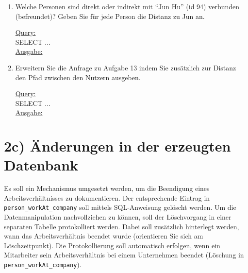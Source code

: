 \begin{enumerate}
    \item Welche Personen sind direkt oder indirekt mit \enquote{Jun Hu} (id 94) verbunden (befreundet)? Geben Sie für jede Person die Distanz zu Jun an.

    \uline{Query:}\\
    SELECT ...\\
    \uline{Ausgabe:}\\

    \item Erweitern Sie die Anfrage zu Aufgabe 13 indem Sie zusätzlich zur Distanz den Pfad zwischen den Nutzern ausgeben.

    \uline{Query:}\\
    SELECT ...\\
    \uline{Ausgabe:}\\

\end{enumerate}

\section*{2c) Änderungen in der erzeugten Datenbank}
Es soll ein Mechanismus umgesetzt werden, um die Beendigung eines Arbeitsverhältnisses zu dokumentieren.
Der entsprechende Eintrag in \texttt{person\_workAt\_company} soll mittels SQL-Anweisung gelöscht werden.
Um die Datenmanipulation nachvollziehen zu können, soll der Löschvorgang in einer separaten Tabelle protokolliert werden.
Dabei soll zusätzlich hinterlegt werden, wann das Arbeitsverhältnis beendet wurde (orientieren Sie sich am Löschzeitpunkt).
Die Protokollierung soll automatisch erfolgen, wenn ein Mitarbeiter sein Arbeitsverhältnis bei einem Unternehmen beendet (Löschung in \texttt{person\_workAt\_company}).


